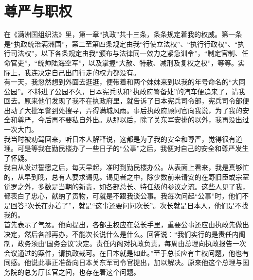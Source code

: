 \fancyhead[RO]{\thepage} %
\fancyhead[LE]{\thepage} %
\chapter*{尊严与职权}
在《满洲国组织法》里，第一章“执政”共十三条，条条规定着我的权威。第一条是“执政统治满洲国”，第二至第四条规定由我“行使立法权”、“执行行政权”、“执行司法权”，以下各条规定由我“颁布与法律同一效力之紧急训令”，“制定官制、任命官吏”，“统帅陆海空军”，以及掌握“大赦、特赦、减刑及复权之权”，等等。实际上，我连决定自己出门行走的权力都没有。\\

有一天，我忽然想到外面去逛逛，便带着和两个妹妹来到以我的年号命名的“大同公园”。不料进了公园不久，日本宪兵队和“执政府警备处”的汽车便追来了，请我回去。原来他们发现了我不在执政府里，就告诉了日本宪兵司令部，宪兵司令部便出动了大批军警到处搜寻，弄得满城风雨。事后执政府顾问官向我说，为了我的安全和尊严，今后再不要私自外出。从那以后，除了关东军安排的以外，我再没出过一次大门。\\

我当时被劝驾回来，听日本人解释说，这都是为了我的安全和尊严，觉得很有道理。可是等我在勤民楼办了一些日子的“公事”之后，我便对自己的安全和尊严发生了怀疑。\\

我自从发过誓愿之后，每天早起，准时到勤民楼办公。从表面上看来，我是真够忙的，从早到晚，总有人要求谒见。谒见者之中，除少数前来请安的在野旧臣或宗室觉罗之外，多数是当朝的新贵，如各部总长、特任级的参议之流。这些人见了我，都表白了忠心，献纳了贡物，可就是不跟我谈公事。我每次问起“公事”时，他们不是回答“次长在办着了”，就是“这事还要问问次长”。次长就是日本人，他们是不找我的。\\

首先表示了气忿。他向提出，各部主权应在总长手里，重要公事还应由执政先做出决定，然后各部再办，不能次长说什么是什么。回答说：“我们实行的是责任内阁制，政务须由‘国务会议’决定。责任内阁对执政负责，每周由总理向执政报告一次会议通过的案件，请执政裁可。在日本就是如此。”至于总长应有主权问题，他也有同感。他说此事正准备向日本关东军司令官提出，加以解决。原来他这个总理与国务院的总务厅长官之间，也存在着这个问题。\\

